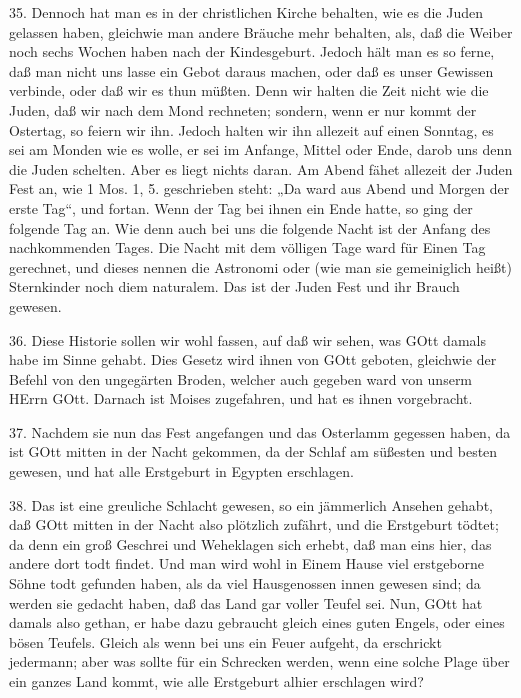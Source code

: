 35. Dennoch hat man es in der christlichen Kirche behalten, wie es die Juden gelassen haben, gleichwie man andere Bräuche mehr behalten, als, daß die Weiber noch sechs Wochen haben nach der Kindesgeburt. Jedoch hält man es so ferne, daß man nicht uns lasse ein Gebot daraus machen, oder daß es unser Gewissen verbinde, oder daß wir es thun müßten. Denn wir halten die Zeit nicht wie die Juden, daß wir nach dem Mond rechneten; sondern, wenn er nur kommt der Ostertag, so feiern wir ihn. Jedoch halten wir ihn allezeit auf einen Sonntag, es sei am Monden wie es wolle, er sei im Anfange, Mittel oder Ende, darob uns denn die Juden schelten. Aber es liegt nichts daran. Am Abend fähet allezeit der Juden Fest an, wie 1 Mos. 1, 5. geschrieben steht: „Da ward aus Abend und Morgen der erste Tag“, und fortan. Wenn der Tag bei ihnen ein Ende hatte, so ging der folgende Tag an. Wie denn auch bei uns die folgende Nacht ist der Anfang des nachkommenden Tages. Die Nacht mit dem völligen Tage ward für Einen Tag gerechnet, und dieses nennen die Astronomi oder (wie man sie gemeiniglich heißt) Sternkinder noch diem naturalem. Das ist der Juden Fest und ihr Brauch gewesen.

36. Diese Historie sollen wir wohl fassen, auf daß wir sehen, was GOtt damals habe im Sinne gehabt. Dies Gesetz wird ihnen von GOtt geboten, gleichwie der Befehl von den ungegärten Broden, welcher auch gegeben ward von unserm HErrn GOtt. Darnach ist Moises zugefahren, und hat es ihnen vorgebracht.

37. Nachdem sie nun das Fest angefangen und das Osterlamm gegessen haben, da ist GOtt mitten in der Nacht gekommen, da der Schlaf
am süßesten und besten gewesen, und hat alle Erstgeburt in Egypten erschlagen.

38. Das ist eine greuliche Schlacht gewesen, so ein jämmerlich Ansehen gehabt, daß GOtt mitten in der Nacht also plötzlich zufährt, und die Erstgeburt tödtet; da denn ein groß Geschrei und Weheklagen sich erhebt, daß man eins hier, das andere dort todt findet. Und man wird wohl in Einem Hause viel erstgeborne Söhne todt gefunden haben, als da viel Hausgenossen innen gewesen sind; da werden sie gedacht haben, daß das Land gar voller Teufel sei. Nun, GOtt hat damals also gethan, er habe dazu gebraucht gleich eines guten Engels, oder eines bösen Teufels. Gleich als wenn bei uns ein Feuer aufgeht, da erschrickt jedermann; aber was sollte für ein Schrecken werden, wenn eine solche Plage über ein ganzes Land kommt, wie alle Erstgeburt alhier erschlagen wird?

